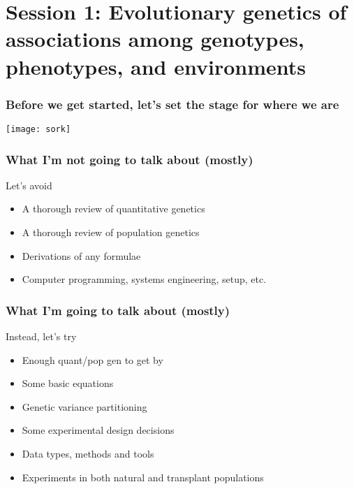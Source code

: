 
\section[Session 1]{Session 1: Evolutionary genetics of associations among
genotypes, phenotypes, and environments}

\begin{frame}
\frametitle{Before we get started, let's set the stage for where we are}
\begin{block}{}
\centering
\texttt{[image: sork]}
\\
\cite[Adapted from][]{Sork:2013tb}

\end{block}{}
\end{frame}

\begin{frame}
\frametitle{What I'm not going to talk about (mostly)}
\begin{block}{Let's avoid}
\begin{itemize}
\item{A thorough review of quantitative genetics}
\item{A thorough review of population genetics}
\item{Derivations of any formulae}
\item{Computer programming, systems engineering, setup, etc.}
\end{itemize}
\end{block}
\end{frame}

\begin{frame}
\frametitle{What I'm going to talk about (mostly)}
\begin{block}{Instead, let's try}
\begin{itemize}
\item{Enough quant/pop gen to get by}
\item{Some basic equations}
\item{Genetic variance partitioning}
\item{Some experimental design decisions}
\item{Data types, methods and tools}
\item{Experiments in both natural and transplant populations}
\end{itemize}
\end{block}
\end{frame}


